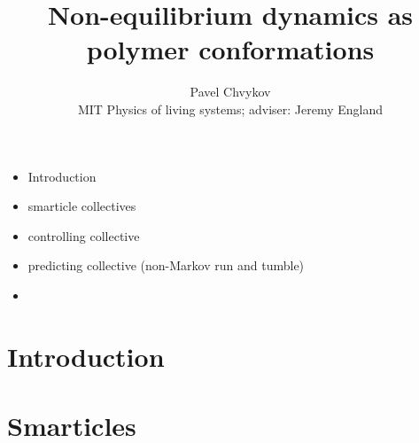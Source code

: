 \documentclass[11pt]{article}
\renewcommand{\=}[1]{\stackrel{#1}{=}} %
\renewcommand{\(}{\left (}
\renewcommand{\)}{\right  )}
\renewcommand{\[}{\left [}
\renewcommand{\]}{\right ]}
\newcommand{\<}{\left <}
\renewcommand{\>}{\right >}
\theoremstyle{definition}
\theoremstyle{remark}
\begin{document}
		\title{Non-equilibrium dynamics as polymer conformations}
		
		\author{Pavel Chvykov\\
			MIT Physics of living systems; adviser: Jeremy England} %
		
		\maketitle


\tableofcontents

\begin{itemize}
	\item Introduction
	\item smarticle collectives
	\item controlling collective
	\item predicting collective (non-Markov run and tumble)
	\item
\end{itemize}

\section{Introduction}
\section{Smarticles}



\end{document}
